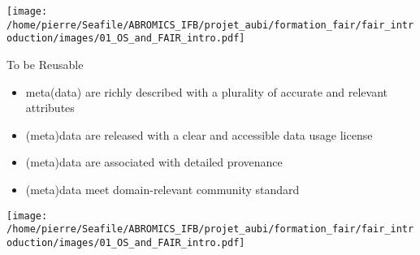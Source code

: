 \begin{frame}
\texttt{[image: /home/pierre/Seafile/ABROMICS\_IFB/projet\_aubi/formation\_fair/fair\_introduction/images/01\_OS\_and\_FAIR\_intro.pdf]}
\end{frame}

\begin{frame}
\begin{block}{To be Reusable}
\begin{itemize}
\item meta(data) are richly described with a plurality of accurate and relevant attributes
\item (meta)data are released with a clear and accessible data usage license
\item (meta)data are associated with detailed provenance
\item (meta)data meet domain-relevant community standard
\end{itemize}
\end{block}
\end{frame}

\begin{frame}
\texttt{[image: /home/pierre/Seafile/ABROMICS\_IFB/projet\_aubi/formation\_fair/fair\_introduction/images/01\_OS\_and\_FAIR\_intro.pdf]}
\end{frame}
